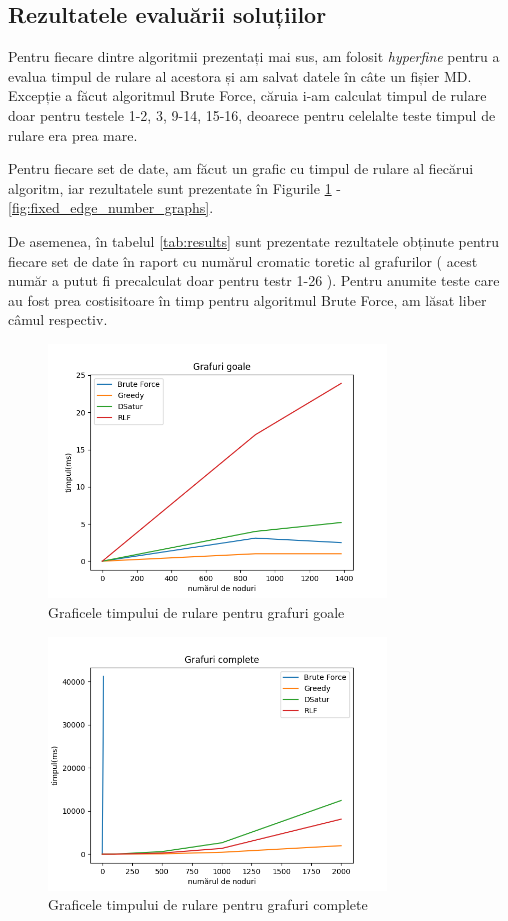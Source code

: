 \documentclass[runningheads]{llncs}
\begin{document}
\subsection{Rezultatele evaluării soluțiilor}
Pentru fiecare dintre algoritmii prezentați mai sus, am folosit \textit{hyperfine}
pentru a evalua timpul de rulare al acestora și am salvat datele în câte un fișier
MD. Excepție a făcut algoritmul Brute Force, căruia i-am calculat timpul de rulare
doar pentru testele 1-2, 3, 9-14, 15-16, deoarece pentru celelalte teste timpul de
rulare era prea mare.

Pentru fiecare set de date, am făcut un grafic cu timpul de rulare al fiecărui
algoritm, iar rezultatele sunt prezentate în Figurile \ref{fig:empty_graphs} - \ref{fig:fixed_edge_number_graphs}.

De asemenea, în tabelul \ref{tab:results} sunt prezentate rezultatele obținute
pentru fiecare set de date în raport cu numărul cromatic toretic al grafurilor (
    acest număr a putut fi precalculat doar pentru testr 1-26
).
Pentru anumite teste care au fost prea costisitoare în timp pentru algoritmul Brute Force, am
lăsat liber câmul respectiv.
\pagebreak

\begin{figure}[!]
\centering
\includegraphics[width=0.8\textwidth]{./graphics/fig1.png}
\caption{Graficele timpului de rulare pentru grafuri goale}
\label{fig:empty_graphs}
\end{figure}

\begin{figure}[!]
\centering
\includegraphics[width=0.8\textwidth]{./graphics/fig2.png}
\caption{Graficele timpului de rulare pentru grafuri complete}
\label{fig:complete_graphs}
\end{figure}
\end{document}
